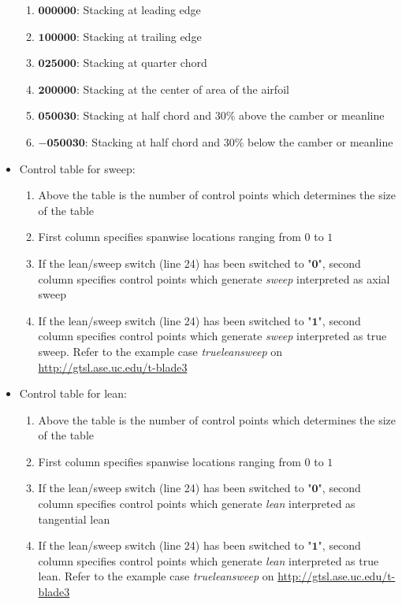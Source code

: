 \documentclass[8pt]{article}
\begin{document}
\begin{itemize}[leftmargin=*]
\begin{enumerate}[label=\alph*]
        \item $\mathbf{000000}$: Stacking at leading edge
        \item $\mathbf{100000}$: Stacking at trailing edge
        \item $\mathbf{025000}$: Stacking at quarter chord
        \item $\mathbf{200000}$: Stacking at the center of area of the airfoil
        \item $\mathbf{050030}$: Stacking at half chord and $30\%$ above the camber or meanline
        \item $\mathbf{-050030}$: Stacking at half chord and $30\%$ below the camber or meanline
    \end{enumerate} 
    \item Control table for sweep:
    \begin{enumerate}[label=\alph*]
        \item Above the table is the number of control points which determines the size of the table
        \item First column specifies spanwise locations ranging from $0$ to $1$
        \item If the lean/sweep switch (line 24) has been switched to "$\mathbf{0}$", second column specifies control points which generate \textit{sweep} interpreted as axial sweep
        \item If the lean/sweep switch (line 24) has been switched to "$\mathbf{1}$", second column specifies control points which generate \textit{sweep} interpreted as true sweep. Refer to the example case \textit{trueleansweep} on \url{http://gtsl.ase.uc.edu/t-blade3}
    \end{enumerate}
    \item Control table for lean:
    \begin{enumerate}[label=\alph*]
        \item Above the table is the number of control points which determines the size of the table
        \item First column specifies spanwise locations ranging from $0$ to $1$
        \item If the lean/sweep switch (line 24) has been switched to "$\mathbf{0}$", second column specifies control points which generate \textit{lean} interpreted as tangential lean
        \item If the lean/sweep switch (line 24) has been switched to "$\mathbf{1}$", second column specifies control points which generate \textit{lean} interpreted as true lean. Refer to the example case \textit{trueleansweep} on \url{http://gtsl.ase.uc.edu/t-blade3}

\end{enumerate}
\end{itemize}
\end{document}
